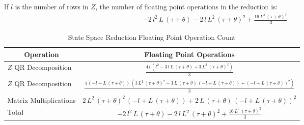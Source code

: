 If $l$ is the number of rows in $Z$, the number of floating point operations
in the reduction is:
\begin{gather*}
  -2\,{l^2}\,L\,\left( \tau + \theta \right)  - 
  2\,l\,{L^2}\,{{\left( \tau + \theta \right) }^2} + 
  {\frac{16\,{L^3}\,{{\left( \tau + \theta \right) }^3}}{3}}
\end{gather*}
\begin{table*}[htbp]
  \begin{center}
    \leavevmode
    \begin{tabular}{|l|c|}
\hline
\multicolumn{1}{|c|}{Operation}&
\multicolumn{1}{|c|}{Floating Point Operations}\\
\hline
$Z$ QR Decomposition&${\frac{4\,l\,\left( {l^2} - 3\,l\,L\,\left( \tau + \theta \right)  + 
       3\,{L^2}\,{{\left( \tau + \theta \right) }^2} \right) }{3}}$\\
\hline
$\bar{Z}$ QR Decomposition&${\frac{4\,\left( -l + L\,\left( \tau + \theta \right)  \right) \,
     \left( 3\,{L^2}\,{{\left( \tau + \theta \right) }^2} - 
       3\,L\,\left( \tau + \theta \right) \,
        \left( -l + L\,\left( \tau + \theta \right)  \right)  + 
       {{\left( -l + L\,\left( \tau + \theta \right)  \right) }^2} \right) }{
     3}}$\\
\hline
Matrix Multiplications&$2\,{L^2}\,{{\left( \tau + \theta \right) }^2}\,
   \left( -l + L\,\left( \tau + \theta \right)  \right)  + 
  2\,L\,\left( \tau + \theta \right) \,
   {{\left( -l + L\,\left( \tau + \theta \right)  \right) }^2}$\\
\hline
Total&$-2\,{l^2}\,L\,\left( \tau + \theta \right)  - 
  2\,l\,{L^2}\,{{\left( \tau + \theta \right) }^2} + 
  {\frac{16\,{L^3}\,{{\left( \tau + \theta \right) }^3}}{3}}$
\\
\hline
    \end{tabular}
    \caption{State Space Reduction Floating Point Operation Count}
    \label{tab:RedCount}
  \end{center}
\end{table*}
